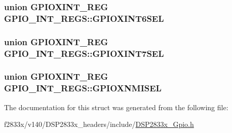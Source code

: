 \subsubsection[{G\+P\+I\+O\+X\+I\+N\+T6\+S\+E\+L}]{\setlength{\rightskip}{0pt plus 5cm}union {\bf G\+P\+I\+O\+X\+I\+N\+T\+\_\+\+R\+E\+G} G\+P\+I\+O\+\_\+\+I\+N\+T\+\_\+\+R\+E\+G\+S\+::\+G\+P\+I\+O\+X\+I\+N\+T6\+S\+E\+L}\label{struct_g_p_i_o___i_n_t___r_e_g_s_a3690647097e7286b4331d4796ce88677}
\hypertarget{struct_g_p_i_o___i_n_t___r_e_g_s_ac31f0fb91f35ad7c03d188898e76cb0e}{}
\subsubsection[{G\+P\+I\+O\+X\+I\+N\+T7\+S\+E\+L}]{\setlength{\rightskip}{0pt plus 5cm}union {\bf G\+P\+I\+O\+X\+I\+N\+T\+\_\+\+R\+E\+G} G\+P\+I\+O\+\_\+\+I\+N\+T\+\_\+\+R\+E\+G\+S\+::\+G\+P\+I\+O\+X\+I\+N\+T7\+S\+E\+L}\label{struct_g_p_i_o___i_n_t___r_e_g_s_ac31f0fb91f35ad7c03d188898e76cb0e}
\hypertarget{struct_g_p_i_o___i_n_t___r_e_g_s_aa7c7bbb9574a5a910c11d0170b3b029b}{}
\subsubsection[{G\+P\+I\+O\+X\+N\+M\+I\+S\+E\+L}]{\setlength{\rightskip}{0pt plus 5cm}union {\bf G\+P\+I\+O\+X\+I\+N\+T\+\_\+\+R\+E\+G} G\+P\+I\+O\+\_\+\+I\+N\+T\+\_\+\+R\+E\+G\+S\+::\+G\+P\+I\+O\+X\+N\+M\+I\+S\+E\+L}\label{struct_g_p_i_o___i_n_t___r_e_g_s_aa7c7bbb9574a5a910c11d0170b3b029b}


The documentation for this struct was generated from the following file\+:\begin{DoxyCompactItemize}
\item 
f2833x/v140/\+D\+S\+P2833x\+\_\+headers/include/\hyperlink{_d_s_p2833x___gpio_8h}{D\+S\+P2833x\+\_\+\+Gpio.\+h}\end{DoxyCompactItemize}
